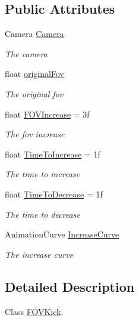 \subsection*{Public Attributes}
\begin{DoxyCompactItemize}
\item 
Camera \hyperlink{class_lerp2_assets_1_1_utility_1_1_f_o_v_kick_a09705b10fb545d218524d96c7d58c8d0}{Camera}
\begin{DoxyCompactList}\small\item\em The camera \end{DoxyCompactList}\item 
float \hyperlink{class_lerp2_assets_1_1_utility_1_1_f_o_v_kick_a163204d7868abc905a32af9005ddcf62}{original\+Fov}
\begin{DoxyCompactList}\small\item\em The original fov \end{DoxyCompactList}\item 
float \hyperlink{class_lerp2_assets_1_1_utility_1_1_f_o_v_kick_a09663f4d9f6b8dfb1dd52c1d5c03860e}{F\+O\+V\+Increase} = 3f
\begin{DoxyCompactList}\small\item\em The fov increase \end{DoxyCompactList}\item 
float \hyperlink{class_lerp2_assets_1_1_utility_1_1_f_o_v_kick_abe3956c5b464bfa896adc529b762ca4c}{Time\+To\+Increase} = 1f
\begin{DoxyCompactList}\small\item\em The time to increase \end{DoxyCompactList}\item 
float \hyperlink{class_lerp2_assets_1_1_utility_1_1_f_o_v_kick_aeff84dc4490b39670cabbdff389abba5}{Time\+To\+Decrease} = 1f
\begin{DoxyCompactList}\small\item\em The time to decrease \end{DoxyCompactList}\item 
Animation\+Curve \hyperlink{class_lerp2_assets_1_1_utility_1_1_f_o_v_kick_a035f8afbd1e1029c8b8a15af490d4ee9}{Increase\+Curve}
\begin{DoxyCompactList}\small\item\em The increase curve \end{DoxyCompactList}\end{DoxyCompactItemize}


\subsection{Detailed Description}
Class \hyperlink{class_lerp2_assets_1_1_utility_1_1_f_o_v_kick}{F\+O\+V\+Kick}. 



